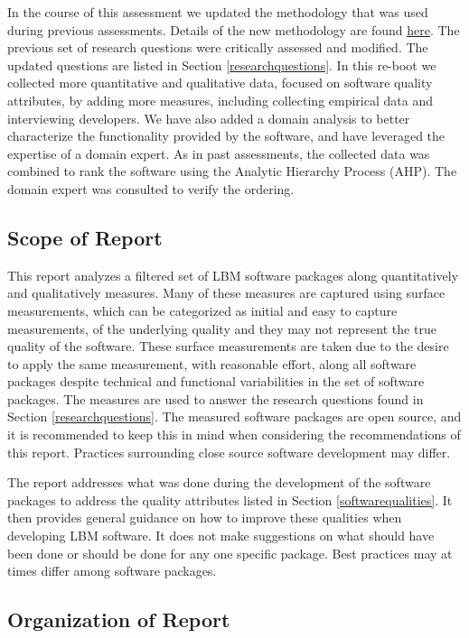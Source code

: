 \documentclass[12pt, notitlepage]{article}
\begin{document}
In the course of this assessment we updated the methodology that was used during previous assessments. Details of the new methodology are found \href{https://github.com/smiths/AIMSS/blob/master/StateOfPractice/Methodology/Methodology.pdf}{here}. The previous set of research questions were critically assessed and modified. The updated questions are listed in Section \ref{researchquestions}. In this re-boot we collected more quantitative and qualitative data, focused on software quality attributes, by adding more measures, including collecting empirical data and interviewing developers. We have also added a domain analysis to better characterize the functionality provided by the software, and have leveraged the expertise of a domain expert. As in past assessments, the collected data was combined to rank the software using the Analytic Hierarchy Process (AHP). The domain expert was consulted to verify the ordering.

\subsection{Scope of Report}

This report analyzes a filtered set of LBM software packages along quantitatively and qualitatively measures. Many of these measures are captured using surface measurements, which can be categorized as initial and easy to capture measurements, of the underlying quality and they may not represent the true quality of the software. These surface measurements are taken due to the desire to apply the same measurement, with reasonable effort, along all software packages despite technical and functional variabilities in the set of software packages. The measures are used to answer the research questions found in Section \ref{researchquestions}. The measured software packages are open source, and it is recommended to keep this in mind when considering the recommendations of this report. Practices surrounding close source software development may differ.

The report addresses what was done during the development of the software packages to address the quality attributes listed in Section \ref{softwarequalities}. It then provides general guidance on how to improve these qualities when developing LBM software. It does not make suggestions on what should have been done or should be done for any one specific package. Best practices may at times differ among software packages. 

\subsection{Organization of Report}
\end{document}
